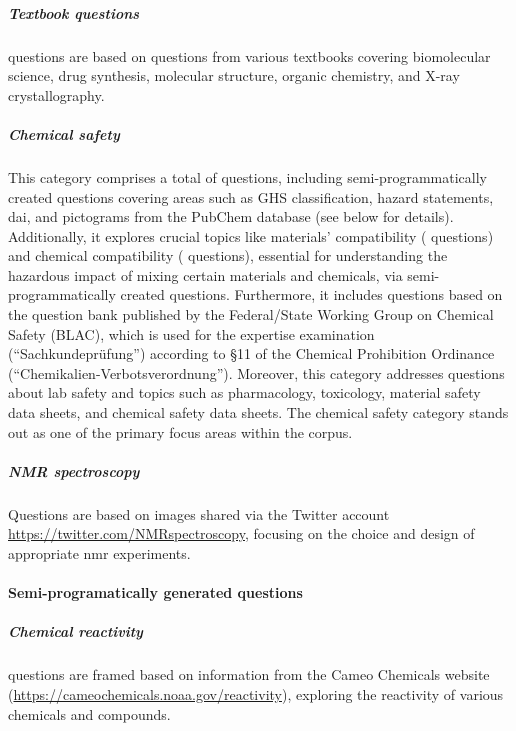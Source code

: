 \documentclass[11pt, oneside]{article}
\begin{document}
\begin{refsection}
\subparagraph{Textbook questions}
 questions are based on questions from various textbooks covering biomolecular science, drug synthesis, molecular structure, organic chemistry, and X-ray crystallography.

\subparagraph{Chemical safety} 
This category comprises a total of  questions, including semi-programmatically created questions covering areas such as GHS classification, hazard statements, \gls{dai}, and pictograms from the PubChem database \autocite{pubchem} (see below for details). 
Additionally, it explores crucial topics like materials' compatibility ( questions) and chemical compatibility ( questions), essential for understanding the hazardous impact of mixing certain materials and chemicals, via semi-programmatically created questions. 
Furthermore, it includes  questions based on the question bank published by the Federal/State Working Group on Chemical Safety (BLAC), which is used for the expertise examination (\enquote{Sachkundeprüfung}) according to §11 of the Chemical Prohibition Ordinance (\enquote{Chemikalien-Verbotsverordnung}).
Moreover, this category addresses questions about lab safety and topics such as pharmacology, toxicology, material safety data sheets, and chemical safety data sheets. 
The chemical safety category stands out as one of the primary focus areas within the \chembench corpus.

\subparagraph{NMR spectroscopy}
Questions are based on images shared via the Twitter account \url{https://twitter.com/NMRspectroscopy}, focusing on the choice and design of  appropriate \gls{nmr} experiments.


\paragraph{Semi-programatically generated questions}

\subparagraph{Chemical reactivity}
 questions are framed based on information from the Cameo Chemicals website (\url{https://cameochemicals.noaa.gov/reactivity}), exploring the reactivity of various chemicals and compounds.




\end{refsection}
\end{document}
